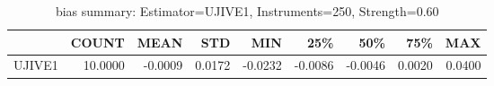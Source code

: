 \begin{table}[ht]
\centering
\caption{bias summary: Estimator=UJIVE1, Instruments=250, Strength=0.60}
\begin{tabular}{lrrrrrrrr}
\toprule
 & COUNT & MEAN & STD & MIN & 25\% & 50\% & 75\% & MAX \\
\midrule
UJIVE1 & 10.0000 & -0.0009 & 0.0172 & -0.0232 & -0.0086 & -0.0046 & 0.0020 & 0.0400 \\
\bottomrule
\end{tabular}
\end{table}
